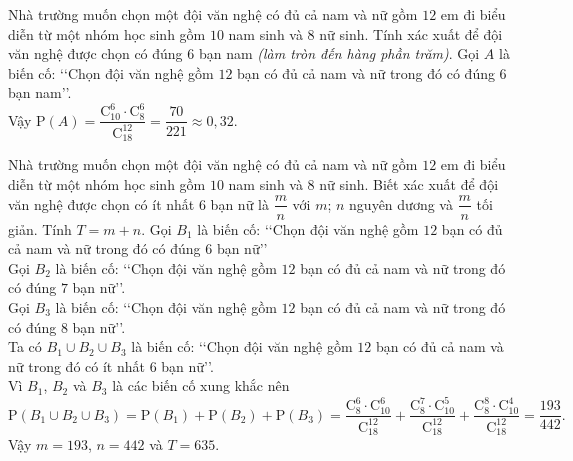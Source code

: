 \begin{ex}%
Nhà trường muốn chọn một đội văn nghệ có đủ cả nam và nữ gồm $12$ em đi biểu diễn từ một nhóm học sinh gồm $10$ nam sinh và $8$ nữ sinh. Tính xác xuất để đội văn nghệ được chọn có đúng $6$ bạn nam \textit{(làm tròn đến hàng phần trăm)}.
\loigiai
{
Gọi $A$ là biến cố: \lq\lq Chọn đội văn nghệ gồm $12$ bạn có đủ cả nam và nữ trong đó có đúng $6$ bạn nam\rq\rq.\\
Vậy $\mathrm{P}(A)=\dfrac{\mathrm{C}_{10}^{6}\cdot\mathrm{C}_{8}^{6}}{\mathrm{C}_{18}^{12}}=\dfrac{70}{221}\approx0{,}32$.
}
\end{ex}

\begin{ex}%
Nhà trường muốn chọn một đội văn nghệ có đủ cả nam và nữ gồm $12$ em đi biểu diễn từ một nhóm học sinh gồm $10$ nam sinh và $8$ nữ sinh. Biết xác xuất để đội văn nghệ được chọn có ít nhất $6$ bạn nữ là $\dfrac{m}{n}$ với $m$; $n$ nguyên dương và $\dfrac{m}{n}$ tối giản. Tính $T=m+n$.
\loigiai
{
Gọi $B_1$ là biến cố: \lq\lq Chọn đội văn nghệ gồm $12$ bạn có đủ cả nam và nữ trong đó có đúng $6$ bạn nữ\rq\rq\\
Gọi $B_2$ là biến cố: \lq\lq Chọn đội văn nghệ gồm $12$ bạn có đủ cả nam và nữ trong đó có đúng $7$ bạn nữ\rq\rq.\\
Gọi $B_3$ là biến cố: \lq\lq Chọn đội văn nghệ gồm $12$ bạn có đủ cả nam và nữ trong đó có đúng $8$ bạn nữ\rq\rq.\\
Ta có $B_1\cup B_2\cup B_3$ là biến cố: \lq\lq Chọn đội văn nghệ gồm $12$ bạn có đủ cả nam và nữ trong đó có ít nhất $6$ bạn nữ\rq\rq.\\
Vì $B_1$, $B_2$ và $B_3$ là các biến cố xung khắc nên \\
$$\mathrm{P}\left(B_1\cup B_2\cup B_3\right)=\mathrm{P}\left(B_1\right)+\mathrm{P}\left(B_2\right)+\mathrm{P}\left(B_3\right)=\dfrac{\mathrm{C}_{8}^{6}\cdot\mathrm{C}_{10}^{6}}{\mathrm{C}_{18}^{12}}+\dfrac{\mathrm{C}_{8}^{7}\cdot\mathrm{C}_{10}^{5}}{\mathrm{C}_{18}^{12}}+\dfrac{\mathrm{C}_{8}^{8}\cdot\mathrm{C}_{10}^{4}}{\mathrm{C}_{18}^{12}}=\dfrac{193}{442}.$$
Vậy $m=193$, $n=442$ và $T=635$.
}
\end{ex}


